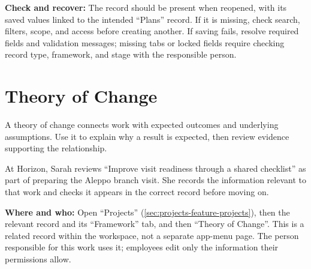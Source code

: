 \textbf{Check and recover:} The record should be present when reopened, with its saved values linked to the intended “Plans” record. If it is missing, check search, filters, scope, and access before creating another. If saving fails, resolve required fields and validation messages; missing tabs or locked fields require checking record type, framework, and stage with the responsible person.

\clearpage
\section{Theory of Change}
\label{sec:projects-feature-theory-of-change}

A theory of change connects work with expected outcomes and underlying assumptions. Use it to explain why a result is expected, then review evidence supporting the relationship.

\begin{rcnote}
At Horizon, Sarah reviews “Improve visit readiness through a shared checklist” as part of preparing the Aleppo branch visit. She records the information relevant to that work and checks it appears in the correct record before moving on.
\end{rcnote}

\textbf{Where and who:} Open “Projects” (\ref{sec:projects-feature-projects}), then the relevant record and its “Framework” tab, and then “Theory of Change”. This is a related record within the workspace, not a separate app-menu page. The person responsible for this work uses it; employees edit only the information their permissions allow.

